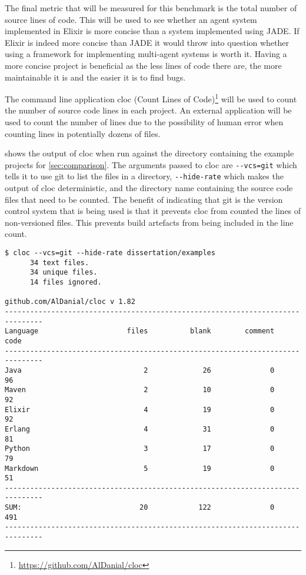 The final metric that will be measured for this benchmark is the total number of source lines of code.
This will be used to see whether an agent system implemented in Elixir is more concise than a system implemented using JADE\@.
If Elixir is indeed more concise than JADE it would throw into question whether using a framework for implementing multi-agent systems is worth it.
Having a more concise project is beneficial as the less lines of code there are, the more maintainable it is and the easier it is to find bugs.

The command line application cloc (Count Lines of Code)\footnote{\url{https://github.com/AlDanial/cloc}} will be used to count the number of source code lines in each project.
An external application will be used to count the number of lines due to the possibility of human error when counting lines in potentially dozens of files.

 shows the output of cloc when run against the directory containing the example projects for \cref{sec:comparison}.
The arguments passed to cloc are \verb|--vcs=git| which tells it to use git to list the files in a directory, \verb|--hide-rate| which makes the output of cloc deterministic, and the directory name containing the source code files that need to be counted.
The benefit of indicating that git is the version control system that is being used is that it prevents cloc from counted the lines of non-versioned files.
This prevents build artefacts from being included in the line count.

\begin{lstlisting}[numbers=none,float=ht,label=lst:cloc,caption=Output of cloc when run on the example projects]
$ cloc --vcs=git --hide-rate dissertation/examples
      34 text files.
      34 unique files.
      14 files ignored.

github.com/AlDanial/cloc v 1.82
-------------------------------------------------------------------------------
Language                     files          blank        comment           code
-------------------------------------------------------------------------------
Java                             2             26              0             96
Maven                            2             10              0             92
Elixir                           4             19              0             92
Erlang                           4             31              0             81
Python                           3             17              0             79
Markdown                         5             19              0             51
-------------------------------------------------------------------------------
SUM:                            20            122              0            491
-------------------------------------------------------------------------------
\end{lstlisting}

